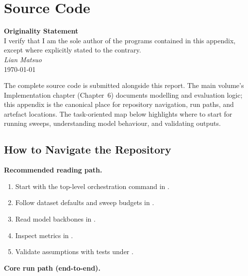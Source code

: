 \chapter{Source Code}

\begin{center}
\textbf{Originality Statement}\\[0.5em]
I verify that I am the sole author of the programs contained in this appendix, except where explicitly stated to the contrary.\\[1em]
\textit{Lian Matsuo}\\
\today
\end{center}

\vspace{1em}

The complete source code is submitted alongside this report. The main volume's Implementation chapter (Chapter~6) documents modelling and evaluation logic; this appendix is the canonical place for repository navigation, run paths, and artefact locations. The task-oriented map below highlights where to start for running sweeps, understanding model behaviour, and validating outputs.

\section{How to Navigate the Repository}

\textbf{Recommended reading path.}
\begin{enumerate}\tightlist
    \item Start with the top-level orchestration command in .
    \item Follow dataset defaults and sweep budgets in .
    \item Read model backbones in .
    \item Inspect metrics in .
    \item Validate assumptions with tests under .
\end{enumerate}

\textbf{Core run path (end-to-end).}

